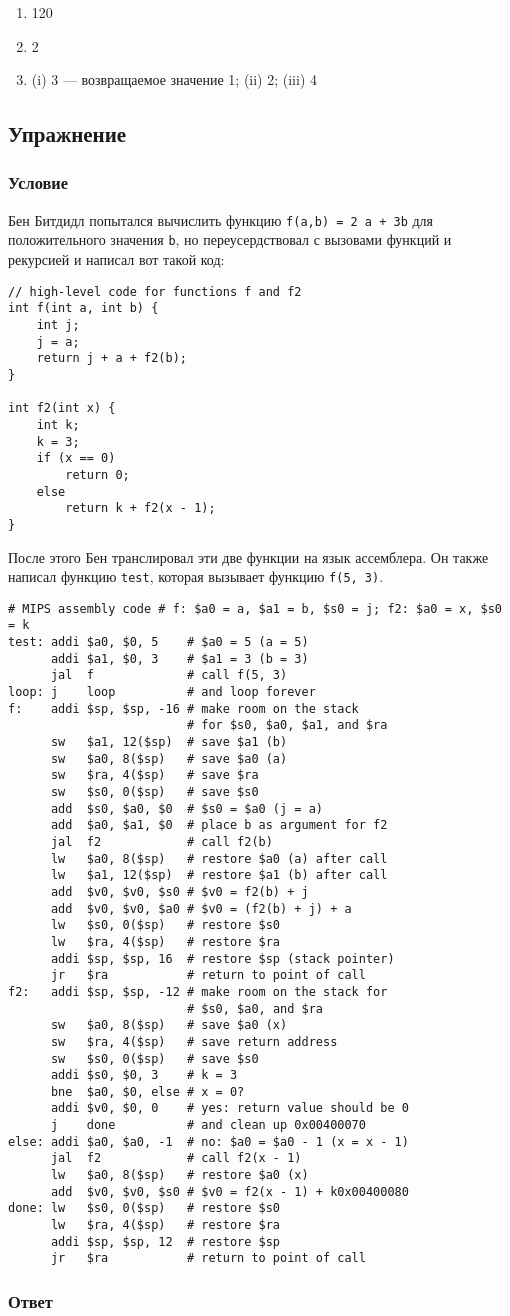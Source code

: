 \documentclass[12pt]{article}
\newenvironment{e}[1][dummy label]{
    \subsection{Упражнение}\label{#1}
    \subsubsection*{Условие}
    }{
    \subsubsection*{Ответ}
}
\begin{document}
    \begin{enumerate}
        \item 120
        \item 2
        \item (i) 3 --- возвращаемое значение 1; (ii) 2; (iii) 4
    \end{enumerate}

    \begin{e}
        Бен Битдидл попытался вычислить функцию \texttt{f(a,b) = 2 a + 3b} для положительного значения \texttt{b}, но переусердствовал с вызовами функций и рекурсией и написал вот такой код:
        \begin{verbatim}
// high-level code for functions f and f2
int f(int a, int b) {
    int j;
    j = a;
    return j + a + f2(b);
}

int f2(int x) {
    int k;
    k = 3;
    if (x == 0)
        return 0;
    else
        return k + f2(x - 1);
}
        \end{verbatim}
        \newpage
        После этого Бен транслировал эти две функции на язык ассемблера. Он также написал функцию \texttt{test}, которая вызывает функцию \texttt{f(5, 3)}.
        \begin{verbatim}
# MIPS assembly code # f: $a0 = a, $a1 = b, $s0 = j; f2: $a0 = x, $s0 = k
test: addi $a0, $0, 5    # $a0 = 5 (a = 5)
      addi $a1, $0, 3    # $a1 = 3 (b = 3)
      jal  f             # call f(5, 3)
loop: j    loop          # and loop forever
f:    addi $sp, $sp, -16 # make room on the stack
                         # for $s0, $a0, $a1, and $ra
      sw   $a1, 12($sp)  # save $a1 (b)
      sw   $a0, 8($sp)   # save $a0 (a)
      sw   $ra, 4($sp)   # save $ra
      sw   $s0, 0($sp)   # save $s0
      add  $s0, $a0, $0  # $s0 = $a0 (j = a)
      add  $a0, $a1, $0  # place b as argument for f2
      jal  f2            # call f2(b)
      lw   $a0, 8($sp)   # restore $a0 (a) after call
      lw   $a1, 12($sp)  # restore $a1 (b) after call
      add  $v0, $v0, $s0 # $v0 = f2(b) + j
      add  $v0, $v0, $a0 # $v0 = (f2(b) + j) + a
      lw   $s0, 0($sp)   # restore $s0
      lw   $ra, 4($sp)   # restore $ra
      addi $sp, $sp, 16  # restore $sp (stack pointer)
      jr   $ra           # return to point of call
f2:   addi $sp, $sp, -12 # make room on the stack for
                         # $s0, $a0, and $ra
      sw   $a0, 8($sp)   # save $a0 (x)
      sw   $ra, 4($sp)   # save return address
      sw   $s0, 0($sp)   # save $s0
      addi $s0, $0, 3    # k = 3
      bne  $a0, $0, else # x = 0?
      addi $v0, $0, 0    # yes: return value should be 0
      j    done          # and clean up 0x00400070
else: addi $a0, $a0, -1  # no: $a0 = $a0 - 1 (x = x - 1)
      jal  f2            # call f2(x - 1)
      lw   $a0, 8($sp)   # restore $a0 (x)
      add  $v0, $v0, $s0 # $v0 = f2(x - 1) + k0x00400080
done: lw   $s0, 0($sp)   # restore $s0
      lw   $ra, 4($sp)   # restore $ra
      addi $sp, $sp, 12  # restore $sp
      jr   $ra           # return to point of call
        \end{verbatim}


\end{e}
\end{document}
